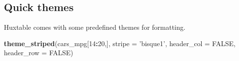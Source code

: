 \documentclass[]{article}
\newenvironment{Shaded}{\begin{snugshade}}{\end{snugshade}}
\newcommand{\DataTypeTok}[1]{\textcolor[rgb]{0.13,0.29,0.53}{#1}}
\newcommand{\DecValTok}[1]{\textcolor[rgb]{0.00,0.00,0.81}{#1}}
\newcommand{\KeywordTok}[1]{\textcolor[rgb]{0.13,0.29,0.53}{\textbf{#1}}}
\newcommand{\NormalTok}[1]{#1}
\newcommand{\OperatorTok}[1]{\textcolor[rgb]{0.81,0.36,0.00}{\textbf{#1}}}
\newcommand{\OtherTok}[1]{\textcolor[rgb]{0.56,0.35,0.01}{#1}}
\newcommand{\StringTok}[1]{\textcolor[rgb]{0.31,0.60,0.02}{#1}}
\begin{document}
\hypertarget{quick-themes}{%
\subsection{Quick themes}\label{quick-themes}}

Huxtable comes with some predefined themes for formatting.

\begin{Shaded}
\begin{Highlighting}[]
\KeywordTok{theme_striped}\NormalTok{(cars_mpg[}\DecValTok{14}\OperatorTok{:}\DecValTok{20}\NormalTok{,], }\DataTypeTok{stripe =} \StringTok{'bisque1'}\NormalTok{, }\DataTypeTok{header_col =} \OtherTok{FALSE}\NormalTok{, }\DataTypeTok{header_row =} \OtherTok{FALSE}\NormalTok{)}
\end{Highlighting}
\end{Shaded}
\end{document}
